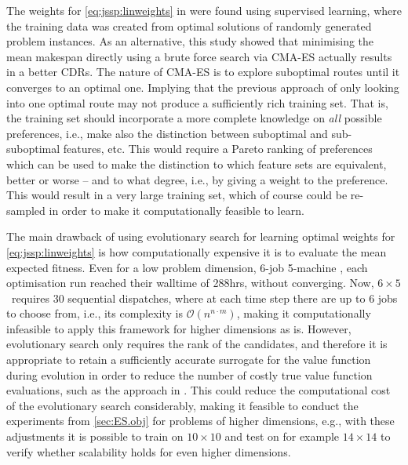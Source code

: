 The weights for \cref{eq:jssp:linweights} in \cite{InRu11a} were found using supervised learning, where the training data was created from optimal solutions of randomly generated problem instances. As an alternative, this study showed  that minimising the mean makespan directly using a brute force search via CMA-ES actually results in a better CDRs. The nature of CMA-ES is to explore suboptimal routes until it converges to an optimal one. Implying that the previous approach of only looking into one optimal route may not produce a sufficiently rich training set. That is, the training set should incorporate a more complete knowledge on \emph{all} possible preferences, i.e., make also the distinction between suboptimal and sub-suboptimal features, etc.  This would require a Pareto ranking of preferences which can be used to make the distinction to which feature sets are equivalent, better or worse -- and to what degree, i.e., by giving a weight to the preference. This would result in a very large training set, which of course could be re-sampled in order to make it computationally feasible to learn.

The main drawback of using evolutionary search for learning optimal weights for \cref{eq:jssp:linweights} is how computationally expensive it is to evaluate the mean expected fitness. Even for a low problem dimension, 6-job 5-machine \JSP , each optimisation run reached their walltime of 288hrs, without converging. Now, $6\times5$ \JSP\ requires 30 sequential dispatches, where at each time step there are up to $6$ jobs to choose from, i.e., its complexity is $\mathcal{O}(n^{n\cdot m})$, making it computationally infeasible to apply this framework for higher dimensions as is. 
However, evolutionary search only requires the rank of the candidates, and therefore it is appropriate to retain a sufficiently accurate surrogate for the value function during evolution in order to reduce the number of costly true value function evaluations, such as the approach in \cite{InRu11b}. This could reduce the computational cost of the evolutionary search considerably, making it feasible to conduct the experiments from \cref{sec:ES.obj} for problems of higher dimensions, e.g., with these adjustments it is possible to train on $10\times10$ and test on for example $14\times14$ to verify whether scalability holds for even higher dimensions.  





